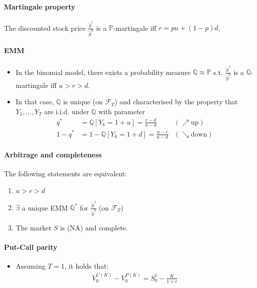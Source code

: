 \documentclass[a4paper,landscape,8pt,fleqn]{scrartcl}
\begin{document}
\begin{multicols*}{3}
\paragraph{Martingale property}

The discounted stock price $\frac{\tilde S^1}{\tilde S^0}$ is a $\mathbb{P}$-martingale iff $r = p u + (1-p) d$.

\paragraph{EMM}

\begin{itemize}
\item In the binomial model, there exists a probability measure $\mathbb{Q} \approx \mathbb{P}$ s.t. $\frac{\tilde S^1}{\tilde S^0}$ is a $\mathbb{Q}$-martingale iff $u > r > d$.
\item In that case, $\mathbb{Q}$ is unique (on $\mathcal{F}_T$) and characterised by the property that $Y_1, \ldots, Y_T$ are i.i.d. under $\mathbb{Q}$ with parameter
\begin{align*}
q^\ast &= \mathbb{Q}[Y_k = 1+u] = \frac{r-d}{u-d} & (\nearrow \text{up}) \\
1-q^\ast &= 1 - \mathbb{Q}[Y_k = 1+d] = \frac{u-r}{u-d} & (\searrow \text{down})
\end{align*}
\end{itemize}

\paragraph{Arbitrage and completeness}

The following statements are equivalent:
\begin{enumerate}
\item $u>r>d$
\item $\exists$ a unique EMM $\mathbb{Q}^\ast$ for $\frac{\tilde S^1}{\tilde S^0}$ (on $\mathcal{F}_T$)
\item The market $S$ is (NA) and complete.
\end{enumerate}

\paragraph{Put-Call parity}

\begin{itemize}
\item Assuming $T=1$, it holds that:
\begin{align*}
V_0^{C(K)} - V_0^{P(K)} = S^1_0 - \frac{K}{1+r}
\end{align*}
\end{itemize}


\end{multicols*}
\end{document}
